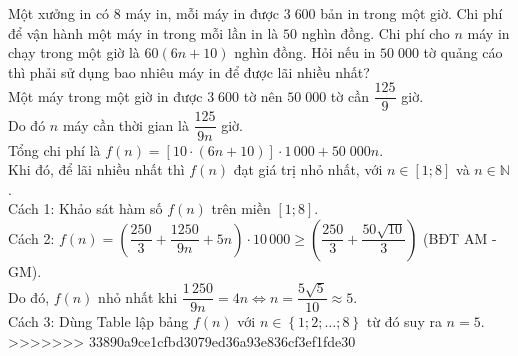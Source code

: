 \begin{ex}%
 Một xưởng in có $8$ máy in, mỗi máy in được $3\;600$ bản in trong một giờ. Chi phí để vận hành một máy in trong mỗi lần in là $50$ nghìn đồng. Chi phí cho $n$ máy in chạy trong một giờ là $60(6n+10)$ nghìn đồng. Hỏi nếu in $50\;000$ tờ quảng cáo thì phải sử dụng bao nhiêu máy in để được lãi nhiều nhất?	\\
 \loigiai
 {Một máy trong một giờ in được $3\;600$ tờ nên $50\;000$ tờ cần $\dfrac{125}{9}$ giờ.\\
 Do đó $n$ máy cần thời gian là $\dfrac{125}{9n}$ giờ.\\
 Tổng chi phí là $f(n)=\left[10\cdot \left(6n+10\right)\right]\cdot 1\,000+50\;000n$.\\
 Khi đó, để lãi nhiều nhất thì $f(n)$ đạt giá trị nhỏ nhất, với $n\in \left[1;8\right]$ và $n\in \mathbb{N}$.\\
 Cách 1: Khảo sát hàm số $f(n)$ trên miền $[1;8]$.\\
 Cách 2: $f(n)=\left(\dfrac{250}{3}+\dfrac{1250}{9n}+5n\right)\cdot 10\,000\geq \left(\dfrac{250}{3}+\dfrac{50\sqrt{10}}{3}\right)$ (BĐT AM - GM).\\
 Do đó, $f(n)$ nhỏ nhất khi $\dfrac{1\,250}{9n}=4n\Leftrightarrow n =\dfrac{5\sqrt{5}}{10}\approx 5$.\\
 Cách 3: Dùng Table lập bảng $f(n)$ với $n\in \left\{1; 2; \ldots ; 8\right\}$ từ đó suy ra $n=5$.
 }
>>>>>>> 33890a9ce1cfbd3079ed36a93e836cf3ef1fde30
\end{ex}